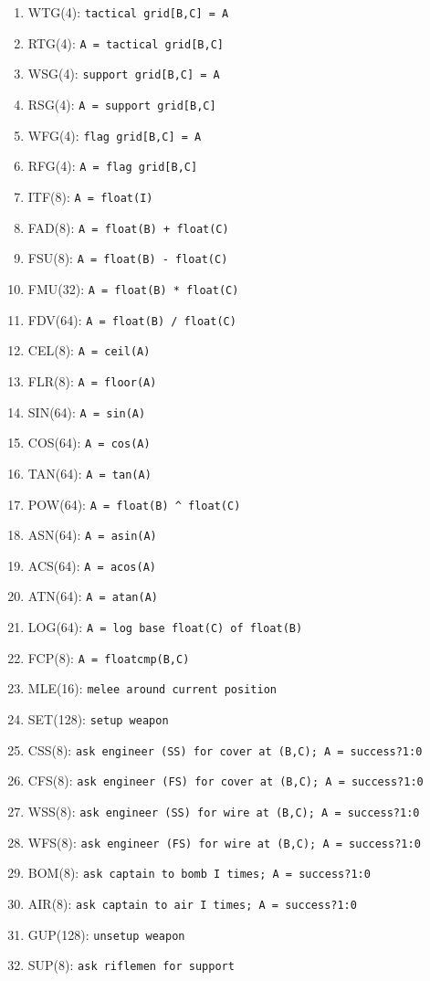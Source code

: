 \documentclass{article}
\begin{document}
\begin{enumerate}[noitemsep]
    \item WTG(4): \texttt{tactical grid[B,C] = A}
    \item RTG(4): \texttt{A = tactical grid[B,C]}
    \item WSG(4): \texttt{support grid[B,C] = A}
    \item RSG(4): \texttt{A = support grid[B,C]}
    \item WFG(4): \texttt{flag grid[B,C] = A}
    \item RFG(4): \texttt{A = flag grid[B,C]}
    \item ITF(8): \texttt{A = float(I)}
    \item FAD(8): \texttt{A = float(B) + float(C)}
    \item FSU(8): \texttt{A = float(B) - float(C)}
    \item FMU(32): \texttt{A = float(B) * float(C)}
    \item FDV(64): \texttt{A = float(B) / float(C)}
    \item CEL(8): \texttt{A = ceil(A)}
    \item FLR(8): \texttt{A = floor(A)}
    \item SIN(64): \texttt{A = sin(A)}
    \item COS(64): \texttt{A = cos(A)}
    \item TAN(64): \texttt{A = tan(A)}
    \item POW(64): \texttt{A = float(B) \^{} float(C)}
    \item ASN(64): \texttt{A = asin(A)}
    \item ACS(64): \texttt{A = acos(A)}
    \item ATN(64): \texttt{A = atan(A)}
    \item LOG(64): \texttt{A = log base float(C) of float(B)}
    \item FCP(8): \texttt{A = floatcmp(B,C)}
    \item MLE(16): \texttt{melee around current position}
    \item SET(128): \texttt{setup weapon}
    \item CSS(8): \texttt{ask engineer (SS) for cover at (B,C); A = success?1:0}
    \item CFS(8): \texttt{ask engineer (FS) for cover at (B,C); A = success?1:0}
    \item WSS(8): \texttt{ask engineer (SS) for wire at (B,C); A = success?1:0}
    \item WFS(8): \texttt{ask engineer (FS) for wire at (B,C); A = success?1:0}
    \item BOM(8): \texttt{ask captain to bomb I times; A = success?1:0}
    \item AIR(8): \texttt{ask captain to air I times; A = success?1:0}
    \item GUP(128): \texttt{unsetup weapon}
    \item SUP(8): \texttt{ask riflemen for support}
\end{enumerate}
\end{document}
